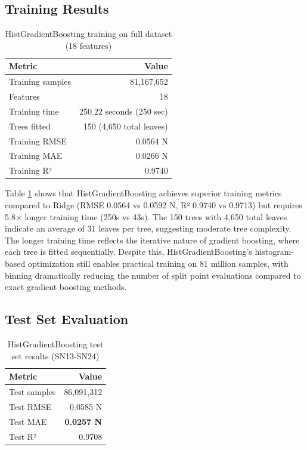 \documentclass[12pt,a4paper]{article}
\begin{document}
\subsection{Training Results}

\begin{table}[H]
\centering
\caption{HistGradientBoosting training on full dataset (18 features)}
\label{tab:hgb_training}
\begin{tabular}{lr}
\toprule
\textbf{Metric} & \textbf{Value} \\
\midrule
Training samples & 81,167,652 \\
Features & 18 \\
Training time & 250.22 seconds (250 sec) \\
Trees fitted & 150 (4,650 total leaves) \\
Training RMSE & 0.0564 N \\
Training MAE & 0.0266 N \\
Training R² & 0.9740 \\
\bottomrule
\end{tabular}
\end{table}

Table \ref{tab:hgb_training} shows that HistGradientBoosting achieves superior training metrics compared to Ridge (RMSE 0.0564 vs 0.0592 N, R² 0.9740 vs 0.9713) but requires 5.8× longer training time (250s vs 43s). The 150 trees with 4,650 total leaves indicate an average of 31 leaves per tree, suggesting moderate tree complexity. The longer training time reflects the iterative nature of gradient boosting, where each tree is fitted sequentially. Despite this, HistGradientBoosting's histogram-based optimization still enables practical training on 81 million samples, with binning dramatically reducing the number of split point evaluations compared to exact gradient boosting methods.

\subsection{Test Set Evaluation}

\begin{table}[H]
\centering
\caption{HistGradientBoosting test set results (SN13-SN24)}
\label{tab:hgb_test}
\begin{tabular}{lr}
\toprule
\textbf{Metric} & \textbf{Value} \\
\midrule
Test samples & 86,091,312 \\
Test RMSE & 0.0585 N \\
Test MAE & \textbf{0.0257 N} \\
Test R² & 0.9708 \\
\bottomrule
\end{tabular}
\end{table}
\end{document}
